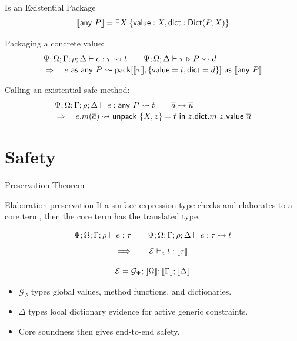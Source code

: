 \begin{frame}{\texorpdfstring{}{any P} Is an Existential Package}
\small
\[
\llbracket \mathsf{any}\ P \rrbracket
=
\exists X.\{\mathsf{value}:X,\mathsf{dict}:\mathsf{Dict}(P,X)\}
\]

\vspace{1mm}
Packaging a concrete value:
\[
\begin{aligned}
&\Psi;\Omega;\Gamma;\rho;\Delta \vdash e:\tau\leadsto t
\qquad
\Psi;\Omega;\Delta \vdash \tau\mathrel{\triangleright} P\leadsto d
\\[-0.5mm]
&\Rightarrow\quad
e\ \mathsf{as}\ \mathsf{any}\ P
\leadsto
\mathsf{pack}[\llbracket \tau \rrbracket,\{\mathsf{value}=t,\mathsf{dict}=d\}]
\ \mathsf{as}\ \llbracket \mathsf{any}\ P \rrbracket
\end{aligned}
\]

\vspace{1mm}
Calling an existential-safe method:
\[
\begin{aligned}
&\Psi;\Omega;\Gamma;\rho;\Delta \vdash e:\mathsf{any}\ P\leadsto t
\qquad
\overline{a}\leadsto\overline{u}
\\[-0.5mm]
&\Rightarrow\quad
e.m(\overline{a})
\leadsto
\mathsf{unpack}\ \{X,z\}=t\ \mathsf{in}\
z.\mathsf{dict}.m\ z.\mathsf{value}\ \overline{u}
\end{aligned}
\]
\end{frame}

\section{Safety}

\begin{frame}{Preservation Theorem}
\small
\begin{block}{Elaboration preservation}
If a surface expression type checks and elaborates to a core term, then the
core term has the translated type.
\end{block}

\[
\Psi;\Omega;\Gamma;\rho\vdash e:\tau
\qquad
\Psi;\Omega;\Gamma;\rho;\Delta\vdash e:\tau\leadsto t
\]
\[
\Longrightarrow
\qquad
\mathcal{E}\vdash_c t:\llbracket \tau \rrbracket
\]

\[
  \mathcal{E}
  =
  \mathcal{G}_\Psi;\llbracket \Omega \rrbracket;\llbracket \Gamma \rrbracket;\llbracket \Delta \rrbracket
\]

\vspace{1mm}
\begin{itemize}
  \item $\mathcal{G}_\Psi$ types global values, method functions, and dictionaries.
  \item $\Delta$ types local dictionary evidence for active generic constraints.
  \item Core soundness then gives end-to-end safety.
\end{itemize}
\end{frame}

